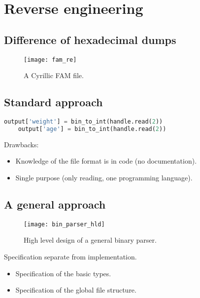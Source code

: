\documentclass[slidestop]{beamer}
\begin{document}
\section{Reverse engineering}
\subsection{Difference of hexadecimal dumps}
\begin{pframe}
  \begin{figure}[]
    \begin{center}
      \texttt{[image: fam\_re]}
    \end{center}
    \caption{A Cyrillic FAM file.}
  \end{figure}
\end{pframe}

\subsection{Standard approach}
\begin{pframe}
  \begin{lstlisting}[language=Python, caption={Ad hoc parser snippet.}]
    output['weight'] = bin_to_int(handle.read(2))
    output['age'] = bin_to_int(handle.read(2))
  \end{lstlisting}

  Drawbacks:
  \begin{itemize}
    \item Knowledge of the file format is in code (no documentation).
    \item Single purpose (only reading, one programming language).
  \end{itemize}
\end{pframe}

\subsection{A general approach}
\begin{pframe}
  \begin{figure}[]
    \begin{center}
      \texttt{[image: bin\_parser\_hld]}
    \end{center}
    \caption{High level design of a general binary parser.}
  \end{figure}

  Specification separate from implementation.
  \begin{itemize}
    \item Specification of the basic types.
    \item Specification of the global file structure.
  \end{itemize}
\end{pframe}
\end{document}
